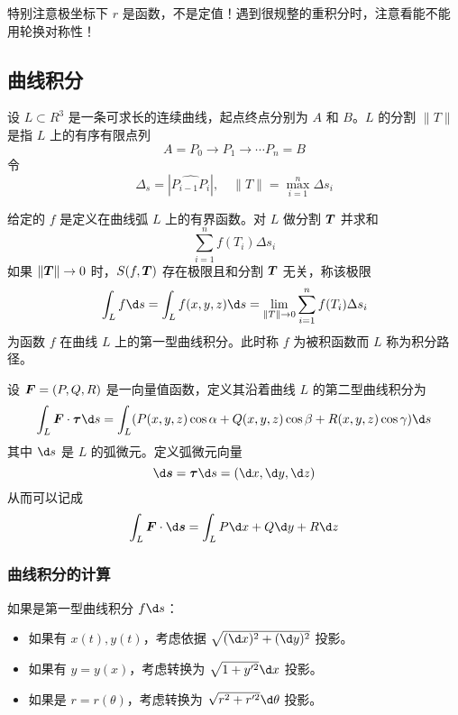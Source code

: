 \begin{note}
	特别注意极坐标下 $r$ 是函数，不是定值！遇到很规整的重积分时，注意看能不能用轮换对称性！
\end{note}

\subsection{曲线积分}

设 $L \subset R^3$ 是一条可求长的连续曲线，起点终点分别为 $A$ 和 $B$。$L$ 的分割 $\|T\|$ 是指 $L$ 上的有序有限点列
\[ A = P_0 \to P_1 \to \cdots P_n = B \]
令
\[ \Delta_s = \left| \widehat{P_{i-1}P_i} \right|, \quad \|T\| = \max_{i=1}^n \Delta s_i \]

\begin{definition}[第一型曲线积分]
	给定的 $f$ 是定义在曲线弧 $L$ 上的有界函数。对 $L$ 做分割 $\boldsymbol{T}$ 并求和
	\[ \sum_{i=1}^{n} f(T_i) \Delta s_i \]
	如果 $\|\boldsymbol{T}\| \to 0$ 时，$S(f, \boldsymbol{T})$ 存在极限且和分割 $\boldsymbol{T}$ 无关，称该极限
	\[ \int_L f \d s = \int_{L} f(x, y, z) \d s = \lim_{\|T\| \to 0} \sum_{i=1}^{n} f(T_i) \Delta s_i \]
	为函数 $f$ 在曲线 $L$ 上的第一型曲线积分。此时称 $f$ 为被积函数而 $L$ 称为积分路径。
\end{definition}

\begin{definition}[第二型曲线积分]
	设 $\boldsymbol{F} = (P, Q, R)$ 是一向量值函数，定义其沿着曲线 $L$ 的第二型曲线积分为
	\[ \int_L \vbf{F} \cdot \vbf{\tau} \d s = \int_L (P(x,y,z) \cos \alpha + Q(x, y, z) \cos \beta + R(x, y, z) \cos \gamma) \d s \]
	其中 $\d s$ 是 $L$ 的弧微元。定义弧微元向量
	\[ \d \vbf{s} = \vbf{\tau} \d s = (\d x, \d y, \d z) \]
	从而可以记成
	\[ \int_L \vbf{F} \cdot \d \vbf{s} = \int_L P \d x + Q \d y + R \d z \]
\end{definition}

\subsubsection*{曲线积分的计算}

如果是第一型曲线积分 $f \d s$：
\begin{itemize}
	\item 如果有 $x(t), y(t)$，考虑依据 $\sqrt{(\d x)^2 + (\d y)^2}$ 投影。
	\item 如果有 $y = y(x)$，考虑转换为 $\sqrt{1 + y'^2} \d x$ 投影。
	\item 如果是 $r = r(\theta)$，考虑转换为 $\sqrt{r^2 + r'^2} \d \theta$ 投影。
\end{itemize}

